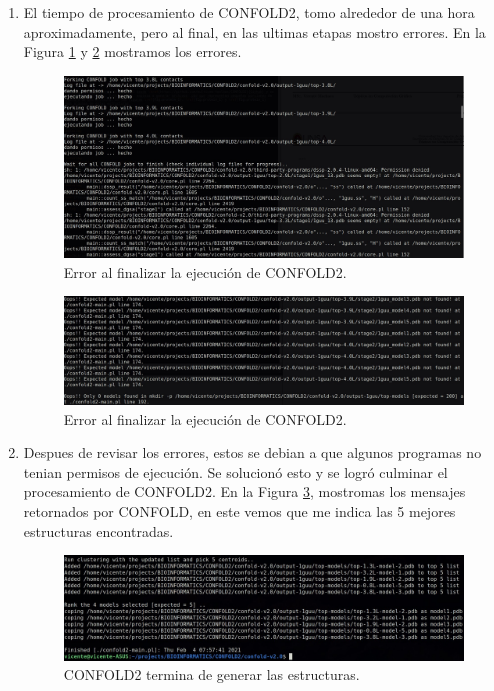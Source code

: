 \documentclass{article}
\begin{document}
\begin{enumerate}
	
		
		\item El tiempo de procesamiento de CONFOLD2, tomo alrededor de una hora aproximadamente, pero al final, en las ultimas etapas mostro errores. En la Figura \ref{fig:confold_error_1} y \ref{fig:confold_error_2} mostramos los errores.
		
		\begin{figure}[H]
			\centering
			\includegraphics[width=\textwidth]{img/papers/confold_error_1}
			\caption{Error al finalizar la ejecución de CONFOLD2.}
			\label{fig:confold_error_1}
		\end{figure}
		
		\begin{figure}[H]
			\centering
			\includegraphics[width=\textwidth]{img/papers/confold_error_2}
			\caption{Error al finalizar la ejecución de CONFOLD2.}
			\label{fig:confold_error_2}
		\end{figure}
	
	
		\item Despues de revisar los errores, estos se debian a que algunos programas no tenian permisos de ejecución. Se solucionó esto y se logró culminar el procesamiento de CONFOLD2. En la Figura \ref{fig:confold}, mostromas los mensajes retornados por CONFOLD, en este vemos que me indica las 5 mejores estructuras encontradas.
		
		\begin{figure}[H]
			\centering
			\includegraphics[width=\textwidth]{img/papers/confold}
			\caption{CONFOLD2 termina de generar las estructuras.}
			\label{fig:confold}
		\end{figure}
	

\end{enumerate}
\end{document}
